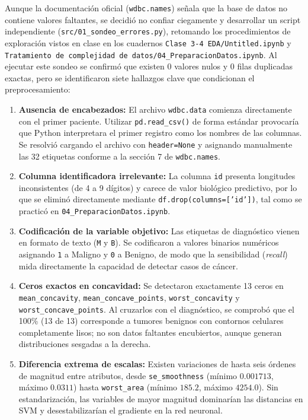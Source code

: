 \documentclass[conference]{IEEEtran}
\begin{document}
Aunque la documentación oficial (\texttt{wdbc.names}) señala que la base de datos no contiene valores faltantes, se decidió no confiar ciegamente y desarrollar un script independiente (\texttt{src/01\_sondeo\_errores.py}), retomando los procedimientos de exploración vistos en clase en los cuadernos \texttt{Clase 3-4 EDA/Untitled.ipynb} y \texttt{Tratamiento de complejidad de datos/04\_PreparacionDatos.ipynb}. Al ejecutar este sondeo se confirmó que existen 0 valores nulos y 0 filas duplicadas exactas, pero se identificaron siete hallazgos clave que condicionan el preprocesamiento:

\begin{enumerate}
    \item \textbf{Ausencia de encabezados:} El archivo \texttt{wdbc.data} comienza directamente con el primer paciente. Utilizar \texttt{pd.read\_csv()} de forma estándar provocaría que Python interpretara el primer registro como los nombres de las columnas. Se resolvió cargando el archivo con \texttt{header=None} y asignando manualmente las 32 etiquetas conforme a la sección 7 de \texttt{wdbc.names}.
    \item \textbf{Columna identificadora irrelevante:} La columna \texttt{id} presenta longitudes inconsistentes (de 4 a 9 dígitos) y carece de valor biológico predictivo, por lo que se eliminó directamente mediante \texttt{df.drop(columns=['id'])}, tal como se practicó en \texttt{04\_PreparacionDatos.ipynb}.
    \item \textbf{Codificación de la variable objetivo:} Las etiquetas de diagnóstico vienen en formato de texto (\texttt{M} y \texttt{B}). Se codificaron a valores binarios numéricos asignando \texttt{1} a Maligno y \texttt{0} a Benigno, de modo que la sensibilidad (\textit{recall}) mida directamente la capacidad de detectar casos de cáncer.
    \item \textbf{Ceros exactos en concavidad:} Se detectaron exactamente 13 ceros en \texttt{mean\_concavity}, \texttt{mean\_concave\_points}, \texttt{worst\_concavity} y \texttt{worst\_concave\_points}. Al cruzarlos con el diagnóstico, se comprobó que el 100\% (13 de 13) corresponde a tumores benignos con contornos celulares completamente lisos; no son datos faltantes encubiertos, aunque generan distribuciones sesgadas a la derecha.
    \item \textbf{Diferencia extrema de escalas:} Existen variaciones de hasta seis órdenes de magnitud entre atributos, desde \texttt{se\_smoothness} (mínimo $0.001713$, máximo $0.0311$) hasta \texttt{worst\_area} (mínimo $185.2$, máximo $4254.0$). Sin estandarización, las variables de mayor magnitud dominarían las distancias en SVM y desestabilizarían el gradiente en la red neuronal.

\end{enumerate}
\end{document}
